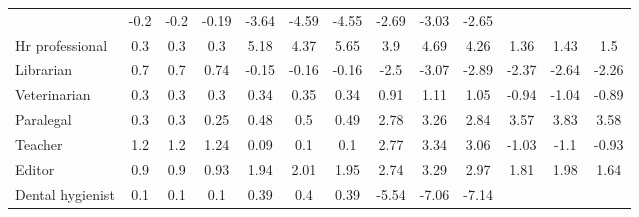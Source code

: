 \begin{table}[htbp!]
{\begin{tabular}{l|ccc|ccc|ccc|ccc}
&\cellcolor{red1} -0.2 & \cellcolor{red1} -0.2 & \cellcolor{red1} -0.19
&\cellcolor{red2} -3.64 & \cellcolor{red3} -4.59 & \cellcolor{red3} -4.55
&\cellcolor{red2} -2.69 & \cellcolor{red2} -3.03 & \cellcolor{red2} -2.65
\\
Hr professional
& \cellcolor{green1} 0.3 & \cellcolor{green1} 0.3 & \cellcolor{green1} 0.3
&\cellcolor{purple3} 5.18 & \cellcolor{green3} 4.37 & \cellcolor{purple3} 5.65
&\cellcolor{green2} 3.9 & \cellcolor{green3} 4.69 & \cellcolor{green3} 4.26
&\cellcolor{green1} 1.36 & \cellcolor{green1} 1.43 & \cellcolor{green1} 1.5
\\
Librarian
& \cellcolor{green1} 0.7 & \cellcolor{green1} 0.7 & \cellcolor{green1} 0.74
&\cellcolor{red1} -0.15 & \cellcolor{red1} -0.16 & \cellcolor{red1} -0.16
&\cellcolor{red2} -2.5 & \cellcolor{red2} -3.07 & \cellcolor{red2} -2.89
&\cellcolor{red2} -2.37 & \cellcolor{red2} -2.64 & \cellcolor{red2} -2.26
\\
Veterinarian
& \cellcolor{green1} 0.3 & \cellcolor{green1} 0.3 & \cellcolor{green1} 0.3
&\cellcolor{green1} 0.34 & \cellcolor{green1} 0.35 & \cellcolor{green1} 0.34
&\cellcolor{green1} 0.91 & \cellcolor{green1} 1.11 & \cellcolor{green1} 1.05
&\cellcolor{red1} -0.94 & \cellcolor{red1} -1.04 & \cellcolor{red1} -0.89
\\
Paralegal
& \cellcolor{green1} 0.3 & \cellcolor{green1} 0.3 & \cellcolor{green1} 0.25
&\cellcolor{green1} 0.48 & \cellcolor{green1} 0.5 & \cellcolor{green1} 0.49
&\cellcolor{green2} 2.78 & \cellcolor{green2} 3.26 & \cellcolor{green2} 2.84
&\cellcolor{green2} 3.57 & \cellcolor{green2} 3.83 & \cellcolor{purple2} 3.58
\\
Teacher
& \cellcolor{green1} 1.2 & \cellcolor{green1} 1.2 & \cellcolor{green1} 1.24
&\cellcolor{green1} 0.09 & \cellcolor{green1} 0.1 & \cellcolor{green1} 0.1
&\cellcolor{green2} 2.77 & \cellcolor{green2} 3.34 & \cellcolor{green2} 3.06
&\cellcolor{red1} -1.03 & \cellcolor{red1} -1.1 & \cellcolor{red1} -0.93
\\
Editor
& \cellcolor{green1} 0.9 & \cellcolor{green1} 0.9 & \cellcolor{green1} 0.93
&\cellcolor{green1} 1.94 & \cellcolor{green2} 2.01 & \cellcolor{green1} 1.95
&\cellcolor{green2} 2.74 & \cellcolor{green2} 3.29 & \cellcolor{green2} 2.97
&\cellcolor{green1} 1.81 & \cellcolor{green1} 1.98 & \cellcolor{green1} 1.64
\\
Dental hygienist
& \cellcolor{green1} 0.1 & \cellcolor{green1} 0.1 & \cellcolor{green1} 0.1
&\cellcolor{green1} 0.39 & \cellcolor{green1} 0.4 & \cellcolor{green1} 0.39
&\cellcolor{red3} -5.54 & \cellcolor{red4} -7.06 & \cellcolor{red4} -7.14

\end{tabular}}
\end{table}
